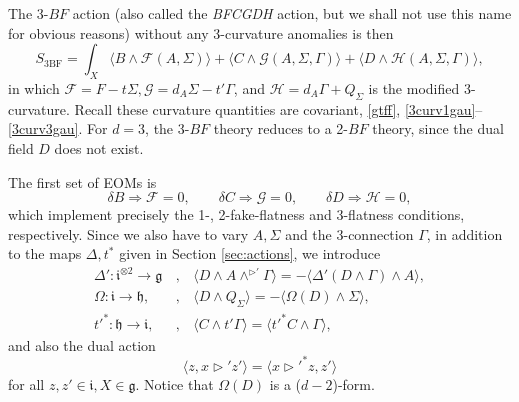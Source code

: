 \documentclass[onecolumn]{article}
\theoremstyle{theorem}
\theoremstyle{remark}
\theoremstyle{example}
\theoremstyle{definition}
\numberwithin{equation}{section}
\begin{document}
The 3-$BF$ action (also called the \textit{BFCGDH} action, but we shall not use this name for obvious reasons) without any 3-curvature anomalies is then
\begin{equation}
    S_\text{3BF} = \int_X \langle B\wedge \mathcal{F}(A,\Sigma)\rangle + \langle C\wedge\mathcal{G}(A,\Sigma,\Gamma)\rangle + \langle D\wedge\mathcal{H}(A,\Sigma,\Gamma)\rangle,\label{eq:3bf}
\end{equation}
in which $\mathcal{F} = F-t\Sigma,\mathcal{G} = d_A\Sigma-t'\Gamma$, and $\mathcal{H}=d_A\Gamma+Q_\Sigma$ is the modified 3-curvature. Recall these curvature quantities are covariant, \eqref{gtff}, \eqref{3curv1gau}--\eqref{3curv3gau}. For $d=3$, the 3-$BF$ theory reduces to a 2-$BF$ theory, since the dual field $D$ does not exist. 

The first set of EOMs is
\begin{equation}
    \delta B \Rightarrow \mathcal{F}=0,\qquad \delta C\Rightarrow \mathcal{G}=0,\qquad \delta D\Rightarrow \mathcal{H}=0,\nonumber
\end{equation}
which implement precisely the 1-, 2-fake-flatness and 3-flatness conditions, respectively. Since we also have  to vary $A,\Sigma$ and the 3-connection $\Gamma$, in addition to the maps $\Delta,t^*$ given in Section \ref{sec:actions}, we introduce
\begin{eqnarray}
\Delta':\mathfrak{i}^{\otimes 2}\rightarrow\mathfrak{g} &\,,\,& \langle D\wedge A\wedge^{\rhd'}\Gamma\rangle=-\langle \Delta'(D\wedge \Gamma)\wedge A\rangle,\nonumber \\
    \Omega:\mathfrak{i}\rightarrow\mathfrak{h},&\,,\,& \langle D\wedge Q_\Sigma\rangle =-\langle \Omega(D)\wedge \Sigma\rangle,\nonumber\\
    t'^*:\mathfrak{h}\rightarrow\mathfrak{i}, &\,,\,& \langle C\wedge t'\Gamma\rangle = \langle t'^*C \wedge \Gamma\rangle,\nonumber 
\end{eqnarray}
and also the dual action
\begin{equation}
    \langle z,x\rhd' z'\rangle = \langle x\rhd'^*z,z'\rangle \nonumber 
\end{equation}
for all $z,z'\in\mathfrak{i},X\in\mathfrak{g}$. Notice that $\Omega(D)$ is a ($d-2$)-form.
\end{document}
